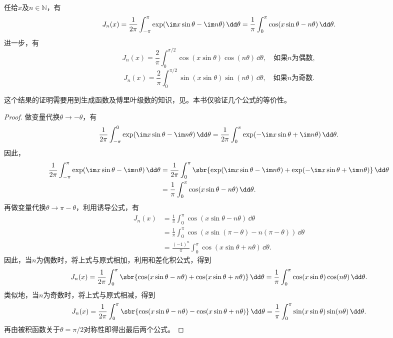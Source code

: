 \begin{proposition}[Bessel积分公式]
    任给$x$及$n\in\mathbb{N}$，有
    \begin{equation}
        J_n(x)=\frac{1}{2\pi}\int_{-\pi}^{\pi}\exp(\im x\sin\theta - \im n\theta)\,\dd\theta=\frac{1}{\pi}\int_{0}^{\pi}\cos(x\sin\theta - n\theta)\,\dd\theta.
    \end{equation}
    进一步，有
    \begin{equation}
        J_n(x)=\frac{2}{\pi}\int_{0}^{\pi/2}\cos(x\sin\theta)\cos(n\theta)\,\dd\theta,\quad \text{如果}n\text{为偶数},
    \end{equation}
    \begin{equation}
        J_n(x)=\frac{2}{\pi}\int_{0}^{\pi/2}\sin(x\sin\theta)\sin(n\theta)\,\dd\theta,\quad \text{如果}n\text{为奇数}.
    \end{equation}
\end{proposition}
这个结果的证明需要用到生成函数及傅里叶级数的知识，见\cite{folland}。本书仅验证几个公式的等价性。
\begin{proof}
    做变量代换$\theta\to -\theta$，有
    \begin{equation}
        \frac{1}{2\pi}\int_{-\pi}^{0}\exp(\im x\sin\theta - \im n\theta)\,\dd\theta=\frac{1}{2\pi}\int_{0}^{\pi}\exp(-\im x\sin\theta + \im n\theta)\,\dd\theta.
    \end{equation}
    因此，
    \begin{align}
        \frac{1}{2\pi}\int_{-\pi}^{\pi}\exp(\im x\sin\theta - \im n\theta)\,\dd\theta&=\frac{1}{2\pi}\int_{0}^{\pi}\sbr{\exp(\im x\sin\theta - \im n\theta)+\exp(-\im x\sin\theta + \im n\theta)}\,\dd\theta\nonumber\\
                                                                                     &=\frac{1}{\pi}\int_{0}^{\pi}\cos(x\sin\theta - n\theta)\,\dd\theta.
    \end{align}
    再做变量代换$\theta\to \pi-\theta$，利用诱导公式，有
    \begin{align}
        J_n(x)&=\frac{1}{\pi}\int_{0}^{\pi}\cos(x\sin\theta - n\theta)\,\dd\theta\nonumber\\
        &=\frac{1}{\pi}\int_{0}^{\pi}\cos(x\sin(\pi-\theta) - n(\pi-\theta))\,\dd\theta\nonumber\\
        &=\frac{(-1)^n}{\pi}\int_{0}^{\pi}\cos(x\sin\theta + n\theta)\,\dd\theta.
    \end{align}
    因此，当$n$为偶数时，将上式与原式相加，利用和差化积公式，得到
    \begin{equation}
        J_n(x)=\frac{1}{2\pi}\int_{0}^{\pi}\sbr{\cos(x\sin\theta - n\theta)+\cos(x\sin\theta + n\theta)}\,\dd\theta=\frac{1}{\pi}\int_{0}^{\pi}\cos(x\sin\theta)\cos(n\theta)\,\dd\theta.
    \end{equation}
    类似地，当$n$为奇数时，将上式与原式相减，得到
    \begin{equation}
        J_n(x)=\frac{1}{2\pi}\int_{0}^{\pi}\sbr{\cos(x\sin\theta - n\theta)-\cos(x\sin\theta + n\theta)}\,\dd\theta=\frac{1}{\pi}\int_{0}^{\pi}\sin(x\sin\theta)\sin(n\theta)\,\dd\theta.
    \end{equation}
    再由被积函数关于$\theta=\pi/2$对称性即得出最后两个公式。
\end{proof}
